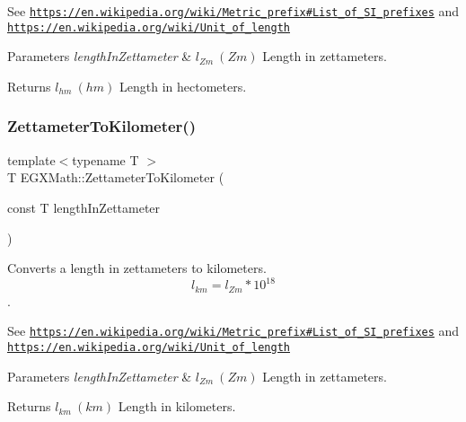 See \href{https://en.wikipedia.org/wiki/Metric_prefix#List_of_SI_prefixes}{\tt https\+://en.\+wikipedia.\+org/wiki/\+Metric\+\_\+prefix\#\+List\+\_\+of\+\_\+\+S\+I\+\_\+prefixes} and \href{https://en.wikipedia.org/wiki/Unit_of_length}{\tt https\+://en.\+wikipedia.\+org/wiki/\+Unit\+\_\+of\+\_\+length} 
\begin{DoxyParams}{Parameters}
{\em length\+In\+Zettameter} & $ l_{Zm}\ (Zm)$ Length in zettameters. \\
\hline
\end{DoxyParams}
\begin{DoxyReturn}{Returns}
$ l_{hm}\ (hm)$ Length in hectometers. 
\end{DoxyReturn}
\mbox{\label{group___e_g_x_math-_conversions-_length_conversions-_zettameter-_s_i_ga99d03473393cdeeeca462cdd0928c9d9}} 
\subsubsection{\texorpdfstring{Zettameter\+To\+Kilometer()}{ZettameterToKilometer()}}
{\footnotesize\ttfamily template$<$typename T $>$ \\
T E\+G\+X\+Math\+::\+Zettameter\+To\+Kilometer (\begin{DoxyParamCaption}\item[{const T}]{length\+In\+Zettameter }\end{DoxyParamCaption})}



Converts a length in zettameters to kilometers. \[ l_{km}=l_{Zm} * 10^{18} \]. 

See \href{https://en.wikipedia.org/wiki/Metric_prefix#List_of_SI_prefixes}{\tt https\+://en.\+wikipedia.\+org/wiki/\+Metric\+\_\+prefix\#\+List\+\_\+of\+\_\+\+S\+I\+\_\+prefixes} and \href{https://en.wikipedia.org/wiki/Unit_of_length}{\tt https\+://en.\+wikipedia.\+org/wiki/\+Unit\+\_\+of\+\_\+length} 
\begin{DoxyParams}{Parameters}
{\em length\+In\+Zettameter} & $ l_{Zm}\ (Zm)$ Length in zettameters. \\
\hline
\end{DoxyParams}
\begin{DoxyReturn}{Returns}
$ l_{km}\ (km)$ Length in kilometers. 
\end{DoxyReturn}
\mbox{\label{group___e_g_x_math-_conversions-_length_conversions-_zettameter-_s_i_gaf29478b073f568afbf9c70b3c2eb94e4}} 

